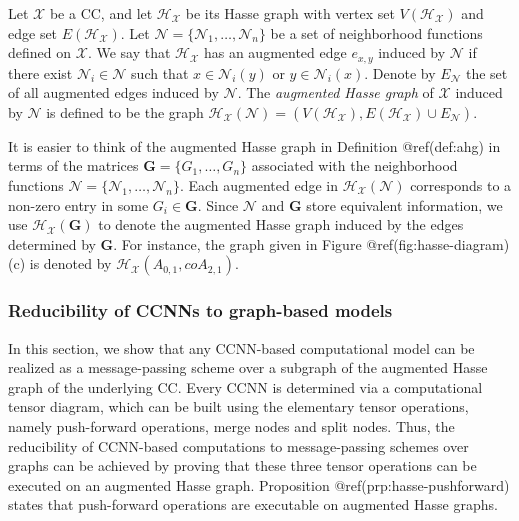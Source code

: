\documentclass[
  12pt,
]{krantz}
\begin{document}
\label{ahg}
Let \(\mathcal{X}\) be a CC, and let \(\mathcal{H}_{\mathcal{X}}\) be
its Hasse graph with vertex set \(V(\mathcal{H}_{\mathcal{X}})\) and
edge set \(E(\mathcal{H}_{\mathcal{X}})\). Let
\(\mathcal{N}=\{\mathcal{N}_1,\ldots,\mathcal{N}_n\}\) be a set of
neighborhood functions defined on \(\mathcal{X}\). We say that
\(\mathcal{H}_{\mathcal{X}}\) has an augmented edge \(e_{x,y}\) induced
by \(\mathcal{N}\) if there exist \(\mathcal{N}_i \in \mathcal{N}\) such
that \(x \in \mathcal{N}_i(y)\) or \(y \in \mathcal{N}_i(x)\). Denote by
\(E_{\mathcal{N}}\) the set of all augmented edges induced by
\(\mathcal{N}\). The \emph{augmented Hasse graph} of \(\mathcal{X}\)
induced by \(\mathcal{N}\) is defined to be the graph
\(\mathcal{H}_{\mathcal{X}}(\mathcal{N})= (V(\mathcal{H}_{\mathcal{X}}), E(\mathcal{H}_{\mathcal{X}}) \cup E_{\mathcal{N}})\).

It is easier to think of the augmented Hasse graph in Definition
@ref(def:ahg) in terms of the matrices \(\mathbf{G}=\{G_1,\ldots,G_n\}\)
associated with the neighborhood functions
\(\mathcal{N}=\{\mathcal{N}_1,\ldots,\mathcal{N}_n\}\). Each augmented
edge in \(\mathcal{H}_{\mathcal{X}}(\mathcal{N})\) corresponds to a
non-zero entry in some \(G_i\in \mathbf{G}\). Since \(\mathcal{N}\) and
\(\mathbf{G}\) store equivalent information, we use
\(\mathcal{H}_{\mathcal{X}}(\mathbf{G})\) to denote the augmented Hasse
graph induced by the edges determined by \(\mathbf{G}\). For instance,
the graph given in Figure @ref(fig:hasse-diagram)(c) is denoted by
\(\mathcal{H}_{\mathcal{X}}( A_{0,1},coA_{2,1})\).

\subsubsection{Reducibility of CCNNs to graph-based
models}\label{reducibility-of-ccnns-to-graph-based-models}

In this section, we show that any CCNN-based computational model can be
realized as a message-passing scheme over a subgraph of the augmented
Hasse graph of the underlying CC. Every CCNN is determined via a
computational tensor diagram, which can be built using the elementary
tensor operations, namely push-forward operations, merge nodes and split
nodes. Thus, the reducibility of CCNN-based computations to
message-passing schemes over graphs can be achieved by proving that
these three tensor operations can be executed on an augmented Hasse
graph. Proposition @ref(prp:hasse-pushforward) states that push-forward
operations are executable on augmented Hasse graphs.
\end{document}
